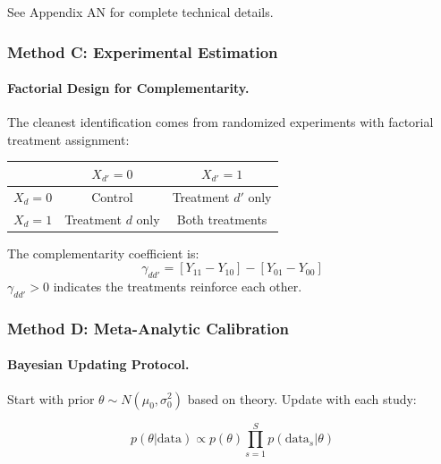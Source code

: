 See Appendix AN for complete technical details.

\subsubsection{Method C: Experimental Estimation}

\paragraph{Factorial Design for Complementarity.}

The cleanest identification comes from randomized experiments with factorial 
treatment assignment:

\begin{center}
\begin{tabular}{c|cc}
& $X_{d'} = 0$ & $X_{d'} = 1$ \\
\hline
$X_d = 0$ & Control & Treatment $d'$ only \\
$X_d = 1$ & Treatment $d$ only & Both treatments \\
\end{tabular}
\end{center}

\begin{theorem}
\label{thm:factorial}
The complementarity coefficient is:
\begin{equation}
\gamma_{dd'} = [Y_{11} - Y_{10}] - [Y_{01} - Y_{00}]
\end{equation}
$\gamma_{dd'} > 0$ indicates the treatments reinforce each other.
\end{theorem}

\subsubsection{Method D: Meta-Analytic Calibration}

\paragraph{Bayesian Updating Protocol.}

Start with prior $\theta \sim N(\mu_0, \sigma_0^2)$ based on theory. Update with 
each study:

\begin{equation}
p(\theta | \text{data}) \propto p(\theta) \prod_{s=1}^{S} p(\text{data}_s | \theta)
\end{equation}

